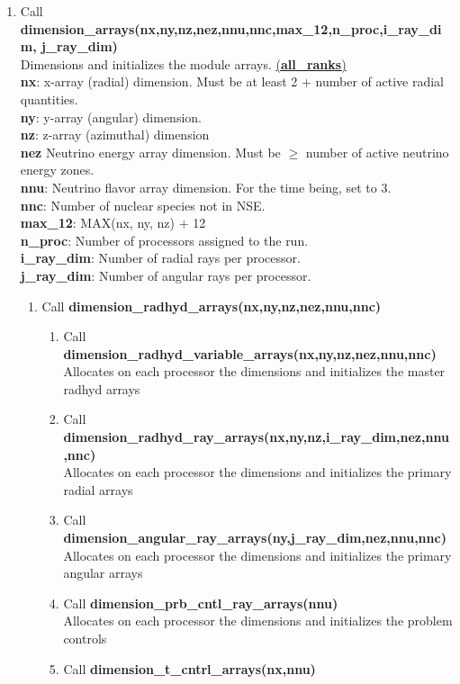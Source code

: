 \documentclass[11pt,doublespace]{article}
\begin{document}
\begin{itemize}
\begin{enumerate}
\begin{enumerate}
  \item Call {\bf dimension\_arrays(nx,ny,nz,nez,nnu,nnc,max\_12,n\_proc,i\_ray\_dim, j\_ray\_dim)}\\
  Dimensions and initializes the module arrays. \underline{({\bf all\_ranks})}\\
    {\bf nx}: x-array (radial) dimension. Must be at least 2 + number of active radial quantities.\\
    {\bf ny}: y-array (angular) dimension.\\
    {\bf nz}: z-array (azimuthal) dimension\\
    {\bf nez} Neutrino energy array dimension. Must be $\ge$ number of active neutrino energy zones.\\
    {\bf nnu}: Neutrino flavor array dimension. For the time being, set to 3.\\
    {\bf nnc}: Number of nuclear species not in NSE.\\
    {\bf max\_12}: MAX(nx, ny, nz) + 12\\
    {\bf n\_proc}: Number of processors assigned to the run.\\
    {\bf i\_ray\_dim}: Number of radial rays per processor.\\
    {\bf j\_ray\_dim}: Number of angular rays per processor.
\begin{enumerate}
  \item Call {\bf dimension\_radhyd\_arrays(nx,ny,nz,nez,nnu,nnc)}
\begin{enumerate}
  \item Call {\bf dimension\_radhyd\_variable\_arrays(nx,ny,nz,nez,nnu,nnc)}\\
    Allocates on each processor  the dimensions and initializes the master radhyd arrays
  \item Call {\bf dimension\_radhyd\_ray\_arrays(nx,ny,nz,i\_ray\_dim,nez,nnu,nnc)}\\
    Allocates on each processor  the dimensions and initializes the primary radial arrays
  \item Call {\bf dimension\_angular\_ray\_arrays(ny,j\_ray\_dim,nez,nnu,nnc)}\\
    Allocates on each processor  the dimensions and initializes the primary angular arrays
  \item Call {\bf dimension\_prb\_cntl\_ray\_arrays(nnu)}\\
    Allocates on each processor  the dimensions and initializes the problem controls
  \item Call {\bf dimension\_t\_cntrl\_arrays(nx,nnu)}

\end{enumerate}
\end{enumerate}
\end{enumerate}
\end{enumerate}
\end{itemize}
\end{document}
